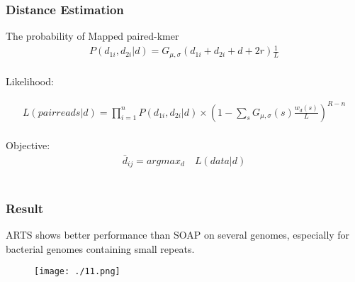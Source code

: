 \documentclass[mathserif]{beamer}
\begin{document}
		\begin{frame}
    			\frametitle{Distance Estimation}
    				
    				The probability of Mapped paired-kmer\\
    						\begin{eqnarray}
   							 P(d_{1i},d_{2i}|d)=G_{\mu ,\sigma}(d_{1i} + d_{2i} + d + 2r)\frac{1}{L}
    						\end{eqnarray}\\
    				Likelihood:    				
    				
    						\begin{eqnarray}
   							 L(pair reads|d)=\prod_{i=1}^{n}P(d_{1i},d_{2i}|d)\times(1-\sum _{s}G_{\mu , \sigma}(s)\frac{w_d(s)}{L})^{R-n}
    						\end{eqnarray}\\
    				Objective:\\
    						\begin{eqnarray}
    							\bar{d}_{ij} = argmax _d \quad L(data|d)
    						\end{eqnarray}\\
    				
    				
    		\end{frame}
		
		\begin{frame}
			\frametitle{Result}
			ARTS shows better performance than SOAP on several genomes, especially for bacterial genomes containing small repeats.
			\begin{figure}
				\centering
				\texttt{[image: ./11.png]}
			\end{figure}
		\end{frame}
\end{document}
